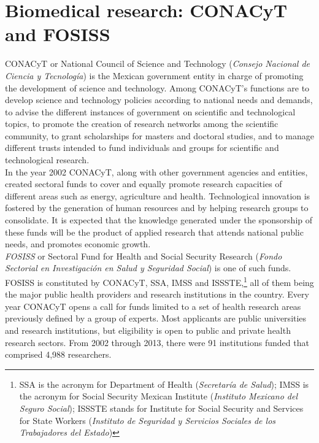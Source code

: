 \documentclass{bmcart}
\begin{document}
\section*{Biomedical research: CONACyT and FOSISS}

CONACyT or National Council of Science and Technology (\emph{Consejo
  Nacional de Ciencia y Tecnolog\'ia}) is the Mexican government
entity in charge of promoting the development of science and
technology.  Among CONACyT's functions are to develop science and
technology policies according to national needs and demands, to advise
the different instances of government on scientific and technological
topics, to promote the creation of research networks among the
scientific community, to grant scholarships for masters and doctoral
studies, and to manage different trusts intended to fund individuals
and groups for scientific and
technological research.\\

In the year 2002 CONACyT, along with other government agencies and
entities, created sectoral funds
to cover and equally
promote research capacities of different areas such as energy, agriculture
and health. Technological innovation is fostered by the generation of human resources
and by helping research groups to consolidate. It is expected that the
knowledge generated under the sponsorship of these funds
will be the product of applied research that attends national public
needs, and promotes economic growth.\\

\emph{FOSISS} or Sectoral Fund for Health and Social Security Research
(\emph{Fondo Sectorial en Investigaci\'on en Salud y Seguridad Social}) is one of
such funds. FOSISS is constituted by CONACyT, SSA, IMSS and ISSSTE,\footnote{SSA
  is the acronym for Department of Health (\emph{Secretar\'ia de Salud}); IMSS is
  the acronym for Social Security Mexican Institute (\emph{Instituto Mexicano
    del Seguro Social}); ISSSTE stands for Institute for Social Security and
  Services for State Workers (\emph{Instituto de Seguridad y Servicios Sociales
    de los Trabajadores del Estado})} all of them being the major public health
providers and research institutions in the country. Every year CONACyT opens a
call for funds limited to a set of health research areas previously defined by a
group of experts. Most applicants are public universities and research
institutions, but eligibility is open to public and private health research sectors.
From 2002 through 2013, there were 91 institutions funded that
comprised 4,988 researchers.\\ 
\end{document}
